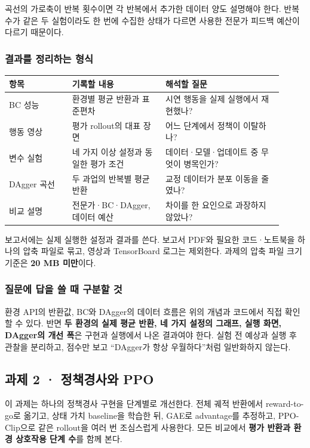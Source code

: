 \documentclass[11pt,a4paper]{article}
\begin{document}
곡선의 가로축이 반복 횟수이면 각 반복에서 추가한 데이터 양도 설명해야 한다. 반복 수가 같은 두 실험이라도 한 번에 수집한 상태가 다르면 사용한 전문가 피드백 예산이 다르기 때문이다.\par

\subsubsection{결과를 정리하는 형식}

\begin{longtable}{p{0.21\linewidth}p{0.31\linewidth}p{0.39\linewidth}}\hline
항목 & 기록할 내용 & 해석할 질문 \\
\hline
BC 성능 & 환경별 평균 반환과 표준편차 & 시연 행동을 실제 실행에서 재현했나? \\
행동 영상 & 평가 rollout의 대표 장면 & 어느 단계에서 정책이 이탈하나? \\
변수 실험 & 네 가지 이상 설정과 동일한 평가 조건 & 데이터·모델·업데이트 중 무엇이 병목인가? \\
DAgger 곡선 & 두 과업의 반복별 평균 반환 & 교정 데이터가 분포 이동을 줄였나? \\
비교 설명 & 전문가·BC·DAgger, 데이터 예산 & 차이를 한 요인으로 과장하지 않았나? \\
\hline\end{longtable}

보고서에는 실제 실행한 설정과 결과를 쓴다. 보고서 PDF와 필요한 코드·노트북을 하나의 압축 파일로 묶고, 영상과 TensorBoard 로그는 제외한다. 과제의 압축 파일 크기 기준은 \textbf{20 MB 미만}이다.\par

\subsubsection{질문에 답을 쓸 때 구분할 것}

환경 API의 반환값, BC와 DAgger의 데이터 흐름은 위의 개념과 코드에서 직접 확인할 수 있다. 반면 \textbf{두 환경의 실제 평균 반환, 네 가지 설정의 그래프, 실행 화면, DAgger의 개선 폭}은 구현과 실행에서 나온 결과여야 한다. 실험 전 예상과 실행 후 관찰을 분리하고, 점수만 보고 “DAgger가 항상 우월하다”처럼 일반화하지 않는다.\par

\clearpage
\subsection{과제 2 · 정책경사와 PPO}


이 과제는 하나의 정책경사 구현을 단계별로 개선한다. 전체 궤적 반환에서 reward-to-go로 옮기고, 상태 가치 baseline을 학습한 뒤, GAE로 advantage를 추정하고, PPO-Clip으로 같은 rollout을 여러 번 조심스럽게 사용한다. 모든 비교에서 \textbf{평가 반환과 환경 상호작용 단계 수}를 함께 본다.\par
\end{document}

